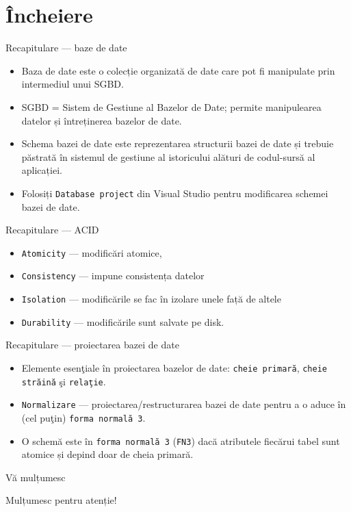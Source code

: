 \documentclass[presentation]{beamer}
\begin{document}
\section{Încheiere}
\label{sec:org8989fe9}
\begin{frame}[label={sec:orgcb4a5f1},fragile]{Recapitulare --- baze de date}
 \begin{itemize}
\item \alert{Baza de date} este o colecție organizată de date care pot fi manipulate prin intermediul unui SGBD.
\item \alert{SGBD} = Sistem de Gestiune al Bazelor de Date; permite manipulearea datelor și întreținerea bazelor de date.
\item \alert{Schema bazei de date} este reprezentarea structurii bazei de date și trebuie păstrată în sistemul de gestiune al istoricului alături de codul-sursă al aplicației.
\item Folosiți \texttt{Database project} din Visual Studio pentru modificarea schemei bazei de date.
\end{itemize}
\end{frame}
\begin{frame}[label={sec:orgc939f9a},fragile]{Recapitulare --- ACID}
 \begin{itemize}
\item \texttt{Atomicity} --- modificări atomice,
\item \texttt{Consistency} --- impune consistența datelor
\item \texttt{Isolation} --- modificările se fac în izolare unele față de altele
\item \texttt{Durability} --- modificările sunt salvate pe disk.
\end{itemize}
\end{frame}
\begin{frame}[label={sec:org9bf4e97},fragile]{Recapitulare --- proiectarea bazei de date}
 \begin{itemize}
\item Elemente esenţiale în proiectarea bazelor de date: \texttt{cheie primară}, \texttt{cheie străină} şi \texttt{relaţie}.
\item \texttt{Normalizare} --- proiectarea/restructurarea bazei de date pentru a o aduce în (cel puţin) \texttt{forma normală 3}.
\item O schemă este în \texttt{forma normală 3} (\texttt{FN3}) dacă atributele fiecărui tabel sunt atomice și depind doar de cheia primară.
\end{itemize}
\end{frame}
\begin{frame}[label={sec:orgb25f1fa}]{Vă mulțumesc}
\begin{center}
Mulțumesc pentru atenție!
\end{center}
\end{frame}
\end{document}
